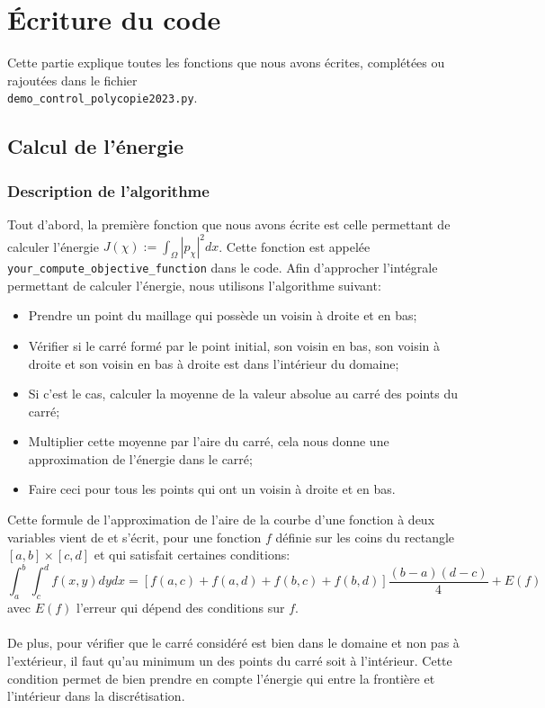 \section{Écriture du code}

Cette partie explique toutes les fonctions que nous avons écrites, complétées ou rajoutées dans le fichier \\ \texttt{demo\_control\_polycopie2023.py}.

\subsection{Calcul de l'énergie}

\subsubsection{Description de l'algorithme}

Tout d'abord, la première fonction que nous avons écrite est celle permettant de calculer l'énergie $J(\chi) := \int_\Omega |p_\chi|^2dx$. Cette fonction est appelée \texttt{your\_compute\_objective\_function} dans le code. Afin d'approcher l'intégrale permettant de calculer l'énergie, nous utilisons l'algorithme suivant:

\begin{itemize}
    \item Prendre un point du maillage qui possède un voisin à droite et en bas;
    \item Vérifier si le carré formé par le point initial, son voisin en bas, son voisin à droite et son voisin en bas à droite est dans l'intérieur du domaine;
    \item Si c'est le cas, calculer la moyenne de la valeur absolue au carré des points du carré;
    \item Multiplier cette moyenne par l'aire du carré, cela nous donne une approximation de l'énergie dans le carré;
    \item Faire ceci pour tous les points qui ont un voisin à droite et en bas.
\end{itemize}

Cette formule de l'approximation de l'aire de la courbe d'une fonction à deux variables vient de \cite{4} et s'écrit, pour une fonction $f$ définie sur les coins du rectangle $[a, b]\times[c, d]$ et qui satisfait certaines conditions:
$$\displaystyle \int_a^b \int_c^d f(x,y)dy dx = [f(a,c) + f(a, d) + f(b, c) + f(b, d)]\frac{(b-a)(d-c)}{4} + E(f)$$ avec $E(f)$ l'erreur qui dépend des conditions sur $f$.\\ \\
De plus, pour vérifier que le carré considéré est bien dans le domaine et non pas à l'extérieur, il faut qu'au minimum un des points du carré soit à l'intérieur. Cette condition permet de bien prendre en compte l'énergie qui entre la frontière et l'intérieur dans la discrétisation.

